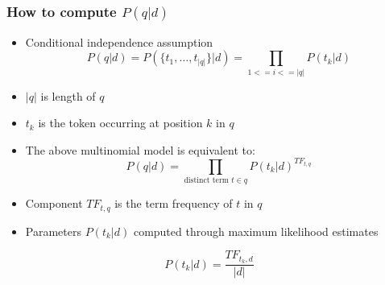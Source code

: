 \documentclass[svgnames]{beamer}
\begin{document}
\begin{frame} \frametitle{How to compute $P(q|d)$}
  
  \begin{block}{}
  \scriptsize
    \begin{itemize}
    \item Conditional independence assumption
	\begin{equation*}
	P(q|d) = P(\{t_1,\ldots,t_{|q|}\}|d) = \prod_{1<=i<=|q|} P(t_k|d)
	\end{equation*}
    \item $|q|$ is length of $q$
    \item $t_k$ is the token occurring at position $k$ in $q$
    \end{itemize}
  \end{block}

  \begin{block}{}
    \scriptsize
    \begin{itemize}
    \item The above multinomial model is equivalent to:
	\begin{equation*}
	P(q|d) = \prod_{\text{distinct term~} t \in q} P(t_k|d)^{TF_{t,q}}
	\end{equation*}
	\item Component $TF_{t,q}$ is the term frequency of $t$ in $q$
    \item Parameters $P(t_k|d)$ computed through maximum likelihood estimates
	\end{itemize}
		\begin{equation*}
		P(t_k|d) = \frac{TF_{t_k,d}}{|d|}
		\end{equation*}
  \end{block}

\end{frame}
\end{document}
